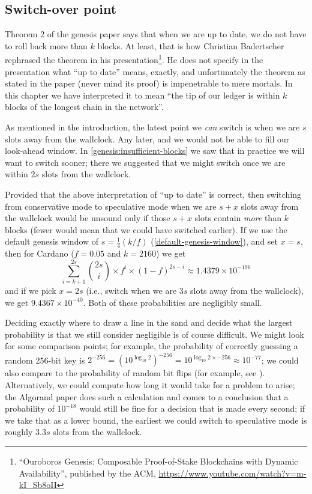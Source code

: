 \subsection{Switch-over point}
\label{genesis:switch-over-point}

Theorem 2 of the genesis paper says that when we are up to date, we do not have
to roll back more than $k$ blocks. At least, that is how Christian Badertscher
rephrased the theorem in his presentation\footnote{``Ouroboros Genesis:
Composable Proof-of-Stake Blockchains with Dynamic Availability'', published by
the ACM, \url{https://www.youtube.com/watch?v=m-kI_Sb8oII}}. He does not specify
in the presentation what ``up to date'' means, exactly, and unfortunately the
theorem as stated in the paper (never mind its proof) is impenetrable to mere
mortals. In this chapter we have interpreted it to mean ``the tip of our ledger
is within $k$ blocks of the longest chain in the network''.

As mentioned in the introduction, the latest point we \emph{can} switch is when
we are $s$ slots away from the wallclock. Any later, and we would not be able to
fill our look-ahead window. In \cref{genesis:insufficient-blocks} we
saw that in practice we will want to switch sooner; there we suggested that
we might switch once we are within $2s$ slots from the wallclock.

Provided that the above interpretation of ``up to
date'' is correct, then switching from conservative mode to speculative mode
when we are $s + x$ slots away from the wallclock would be unsound only if those $s + x$
slots contain \emph{more} than $k$ blocks (fewer would mean that we could have
switched earlier). If we use the default genesis window of $s = \frac{1}{4}(k /
f)$ (\cref {default-genesis-window}), and set $x = s$, then for Cardano
($f = 0.05$ and $k = 2160$) we get
%
\begin{equation*}
\sum_{i = k + 1}^{2s}  {{2s} \choose i} \times f^i \times (1 - f)^{{2s} - i}
\approx 1.4379 \times 10^{-196}
\end{equation*}
%
and if we pick $x = 2s$ (i.e., switch when we are $3s$ slots away from the
wallclock), we get $9.4367 \times 10^{-40}$. Both of these probabilities are
negligibly small.

Deciding exactly where to draw a line in the sand and decide what the largest
probability is that we still consider negligible is of course difficult. We
might look for some comparison points; for example, the probability of correctly
guessing a random 256-bit key is $2 ^ {-256} = (10 ^ {\log_{10} 2})^{-256} = 10
^ {\log_{10} 2 \times -256} \approx 10^{-77}$; we could also compare to the
probability of random bit flips (for example, see \cite{6468485}).
Alternatively, we could compute how long it would take for a problem to arise;
the Algorand paper does such a calculation \cite{chen2017algorand} and comes to
a conclusion that a probability of $10^{-18}$ would still be fine for a decision
that is made every second; if we take that as a lower bound, the earliest we
could switch to speculative mode is roughly $3.3s$ slots from the wallclock.

